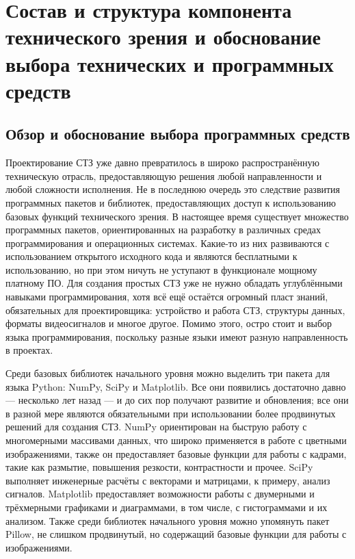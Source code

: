 \chapter{Состав и структура компонента технического зрения и обоснование выбора технических и программных средств} \label{chapt4}

\section{Обзор и обоснование выбора программных средств} \label{sect4_1}

Проектирование СТЗ уже давно превратилось в широко распространённую техническую отрасль, предоставляющую решения любой направленности и любой сложности исполнения. Не в последнюю очередь это следствие развития программных пакетов и библиотек, предоставляющих доступ к использованию базовых функций технического зрения. В настоящее время существует множество программных пакетов, ориентированных на разработку в различных средах программирования и операционных системах. Какие-то из них развиваются с использованием открытого исходного кода и являются бесплатными к использованию, но при этом ничуть не уступают в функционале мощному платному ПО. Для создания простых СТЗ уже не нужно обладать углублёнными навыками программирования, хотя всё ещё остаётся огромный пласт знаний, обязательных для проектировщика: устройство и работа СТЗ, структуры данных, форматы видеосигналов и многое другое. Помимо этого, остро стоит и выбор языка программирования, поскольку разные языки имеют разную направленность в проектах.

Среди базовых библиотек начального уровня можно выделить три пакета для языка Python: NumPy, SciPy и Matplotlib. Все они появились достаточно давно --- несколько лет назад --- и до сих пор получают развитие и обновления; все они в разной мере являются обязательными при использовании более продвинутых решений для создания СТЗ. NumPy ориентирован на быструю работу с многомерными массивами данных, что широко применяется в работе с цветными изображениями, также он предоставляет базовые функции для работы с кадрами, такие как размытие, повышения резкости, контрастности и прочее. SciPy выполняет инженерные расчёты с векторами и матрицами, к примеру, анализ сигналов. Matplotlib предоставляет возможности работы с двумерными и трёхмерными графиками и диаграммами, в том числе, с гистограммами и их анализом. Также среди библиотек начального уровня можно упомянуть пакет Pillow, не слишком продвинутый, но содержащий базовые функции для работы с изображениями.

